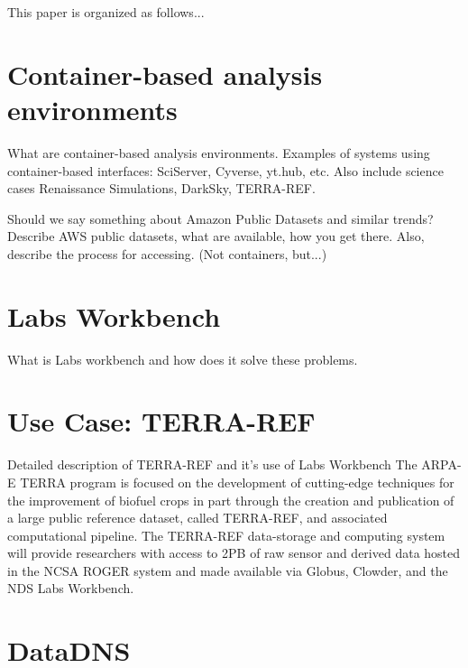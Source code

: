 \documentclass{sig-alternate}
\begin{document}


This paper is organized as follows...

\section{Container-based analysis environments}

What are container-based analysis environments. Examples of systems using container-based interfaces: SciServer, Cyverse, yt.hub, etc. Also include science cases Renaissance Simulations, DarkSky, TERRA-REF.

Should we say something about Amazon Public Datasets and similar trends? Describe AWS public datasets, what are available, how you get there. Also, describe the process for accessing. (Not containers, but...)

\section{Labs Workbench}

What is Labs workbench and how does it solve these problems.

\section{Use Case: TERRA-REF}

Detailed description of TERRA-REF and it's use of Labs Workbench
The ARPA-E TERRA program is focused on the development of cutting-edge techniques for the improvement of biofuel crops in part through the creation and publication of a large public reference dataset, called TERRA-REF, and associated computational pipeline. The TERRA-REF data-storage and computing system will provide researchers with access to 2PB of raw sensor and derived data hosted in the NCSA ROGER system and made available via Globus, Clowder, and the NDS Labs Workbench.  

\section{DataDNS}
\end{document}
